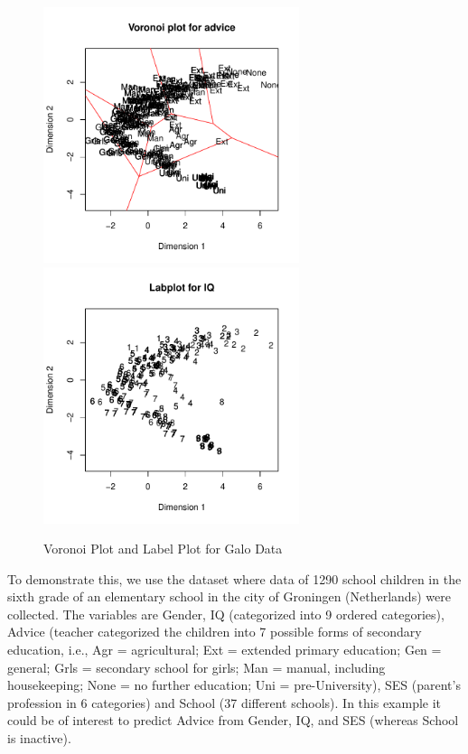 \documentclass[article, nojss]{jss}
\begin{document}
\begin{figure}[hbt]
\begin{center}
\includegraphics[height=75mm, width=75mm]{galoVor.pdf}
\includegraphics[height=75mm, width=75mm]{galoLab.pdf}
\caption{\label{fig:vor}Voronoi Plot and Label Plot for Galo Data}
\end{center}
\end{figure}

To demonstrate this, we use the  dataset \citep{Peschar:75} where data of 1290 school children in the sixth grade of an elementary school in the city of Groningen (Netherlands) were collected. The variables are Gender, IQ (categorized into 9 ordered categories), Advice (teacher categorized the children into 7 possible forms of secondary education, i.e., Agr = agricultural; Ext = extended primary education; Gen = general; 
Grls = secondary school for girls; Man = manual, including housekeeping; None = no further education; Uni = pre-University), SES (parent's profession in 6 categories) and School (37 different schools). In this example it could be of interest to predict Advice from Gender, IQ, and SES (whereas School is inactive).
\end{document}
